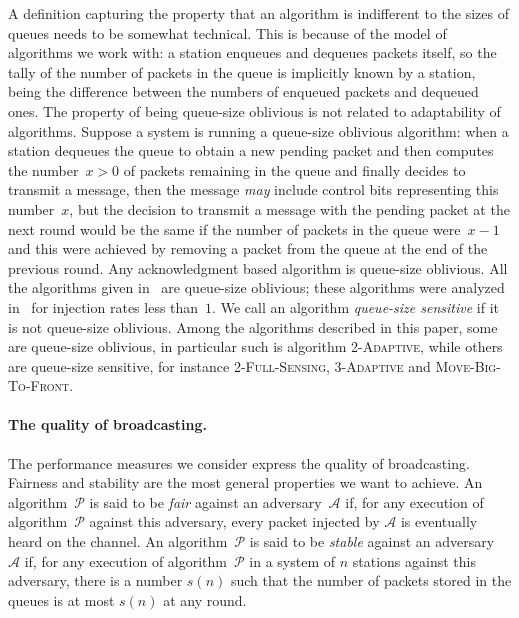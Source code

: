 \documentclass[11pt]{article}
\newcommand{\BBB}{\vspace*{-\bigskipamount}}
\newcommand{\cA}{\mathcal{A}}
\newcommand{\cP}{\mathcal{P}}
\newcommand{\Paragraph}[1]{\BBB\paragraph{#1}}
\begin{document}
A definition capturing the property that an algorithm is indifferent to the sizes of queues needs to be somewhat technical.
This is because of the model of algorithms we work with: a station enqueues and dequeues packets itself, so the tally of the number of packets in the queue is implicitly known by a station, being the difference between the numbers of enqueued packets and dequeued ones.
The property of being queue-size oblivious is not related to adaptability of algorithms.
Suppose a system is running a queue-size oblivious algorithm: when a station dequeues the queue to obtain a new pending packet and then computes the number~$x>0$ of packets remaining in the queue and finally decides to transmit a message, then the message \emph{may} include control bits representing this number~$x$, but the decision to transmit a message with the pending packet at the next round would be the same if the number of packets in the queue were~$x-1$ and this were achieved by removing a packet from the queue at the end of the previous round.
Any acknowledgment based algorithm is queue-size oblivious.
All the algorithms given in~\cite{ChlebusKR-TALG12} are queue-size oblivious; these algorithms were analyzed  in~\cite{ChlebusKR-TALG12} for injection rates less than~$1$.
We call an algorithm \emph{queue-size sensitive} if it is not queue-size oblivious.
Among the algorithms described in this paper, some are queue-size oblivious, in particular  such is algorithm \textsc{2-Adaptive}, while others are queue-size sensitive,  for instance \textsc{2-Full-Sensing}, \textsc{3-Adaptive} and \textsc{Move-Big-To-Front}.





\Paragraph{The quality of broadcasting.}




The performance measures we consider express the quality of broadcasting.
Fairness and stability are the most general properties we want to achieve.
An algorithm~$\cP$ is said to be \emph{fair} against an adversary~$\cA$ if, for any execution of algorithm~$\cP$ against this adversary, every packet injected by $\cA$ is eventually heard on the channel.
An algorithm~$\cP$ is said to be \emph{stable} against an adversary~$\cA$  if, for any execution of algorithm~$\cP$ in a system of $n$ stations against this adversary, there is a number $s(n)$ such that the number of packets stored in the queues is at most $s(n)$ at any round.
\end{document}
